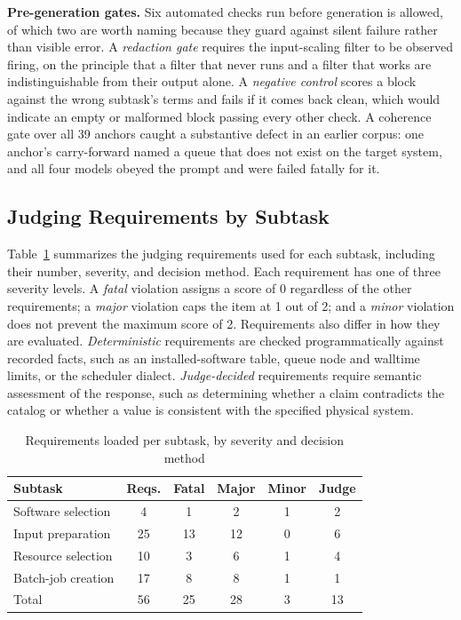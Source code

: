 \documentclass[conference]{IEEEtran}
\begin{document}
\textbf{Pre-generation gates.} Six automated checks run before generation is allowed, of which two are worth naming because they guard against silent failure rather than visible error. A \emph{redaction gate} requires the input-scaling filter to be observed firing, on the principle that a filter that never runs and a filter that works are indistinguishable from their output alone. A \emph{negative control} scores a block against the wrong subtask's terms and fails if it comes back clean, which would indicate an empty or malformed block passing every other check. A coherence gate over all 39 anchors caught a substantive defect in an earlier corpus: one anchor's carry-forward named a queue that does not exist on the target system, and all four models obeyed the prompt and were failed fatally for it.


\subsection{Judging Requirements by Subtask}\label{sec:rubric-detail}
Table~\ref{tab:rubric} summarizes the judging requirements used for each subtask, including their number, severity, and decision method. Each requirement has one of three severity levels. A \emph{fatal} violation assigns a score of 0 regardless of the other requirements; a \emph{major} violation caps the item at 1 out of 2; and a \emph{minor} violation does not prevent the maximum score of 2. Requirements also differ in how they are evaluated. \emph{Deterministic} requirements are checked programmatically against recorded facts, such as an installed-software table, queue node and walltime limits, or the scheduler dialect. \emph{Judge-decided} requirements require semantic assessment of the response, such as determining whether a claim contradicts the catalog or whether a value is consistent with the specified physical system.
\begin{table}[t]
\centering
\caption{Requirements loaded per subtask, by severity and decision method}
\label{tab:rubric}
\begin{tabular}{lccccc}
\toprule
Subtask & Reqs. & Fatal & Major & Minor & Judge \\
\midrule
Software selection & 4 & 1 & 2 & 1 & 2 \\
Input preparation & 25 & 13 & 12 & 0 & 6 \\
Resource selection & 10 & 3 & 6 & 1 & 4 \\
Batch-job creation & 17 & 8 & 8 & 1 & 1 \\
\midrule
Total & 56 & 25 & 28 & 3 & 13 \\
\bottomrule
\end{tabular}
\end{table}
\end{document}
